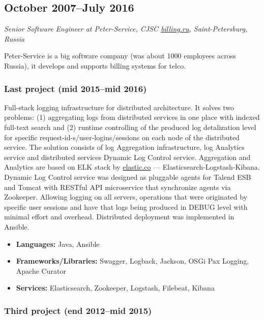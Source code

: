 \subsection*{October 2007--July 2016}

\textit{Senior Software Engineer at Peter-Service, CJSC
\href{https://billing.ru}{billing.ru}, Saint-Petersburg, Russia}

Peter-Service is a big software company (was about 1000 employees
across Russia), it develops and supports billing systems for telco.

\subsubsection*{Last project (mid 2015--mid 2016)}

Full-stack logging infrastructure for distributed architecture. It
solves two problems: (1) aggregating logs from distributed services in
one place with indexed full-text search and (2) runtime controlling of
the produced log detalization level for specific
request-id-s/user-logins/sessions on each node of the distributed
service. The solution consists of log Aggregation infrastructure, log
Analytics service and distributed services Dynamic Log Control
service. Aggregation and Analytics are based on ELK stack by
\href{https://elastic.co}{elastic.co} ---
Elasticsearch-Logstash-Kibana. Dynamic Log Control service was
designed as pluggable agents for Talend ESB and Tomcat with RESTful
API microservice that synchronize agents via Zookeeper. Allowing
logging on all servers, operations that were originated by specific
user sessions and have that logs being produced in DEBUG level with
minimal effort and overhead. Distributed deployment was implemented in
Ansible.

\begin{itemize}[noitemsep, nosep]
  \item \textbf{Languages:} Java, Ansible
  \item \textbf{Frameworks/Libraries:} Swagger, Logback, Jackson, OSGi
Pax Logging, Apache Curator
  \item \textbf{Services:} Elasticsearch, Zookeeper, Logstash,
Filebeat, Kibana
\end{itemize}

\subsubsection*{Third project (end 2012--mid 2015)}

